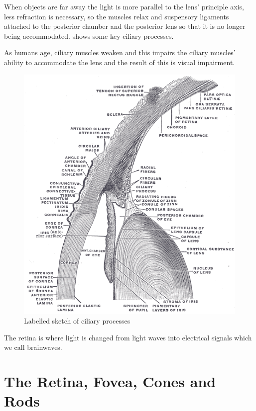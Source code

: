 When objects are far away the light is more parallel to
the lens' principle axis, less refraction is necessary, so
the muscles relax and suspensory ligaments attached to the
posterior chamber and the posterior lens so that it is
no longer being accommodated.\cite{} shows some key ciliary
processes. 

As humans age, ciliary muscles weaken and this impairs the ciliary muscles'
ability to accommodate the lens and the result of this is visual impairment.\cite{fisher1985ciliary}

\begin{figure}[htbp]
  \centering
    \includegraphics{figures/cilary_processes}
  \caption{Labelled sketch of ciliary processes}
  \label{fig:cilary_processes}
\end{figure}

The retina is where light is changed from light waves into electrical signals which we call brainwaves.

\section{The Retina, Fovea, Cones and Rods}

